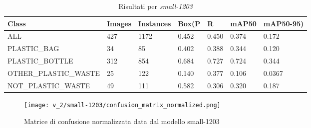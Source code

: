 \begin{table}[h]
    \centering
    \begin{tabularx}{\textwidth}{lYYYYYY}
        \toprule
        Class & Images & Instances & Box(P & R & mAP50 & mAP50-95) \\
        \midrule
        ALL & 427 & 1172 & 0.452 & 0.450 & 0.374 & 0.172 \\
        PLASTIC\_BAG & 34 & 85 & 0.402 & 0.388 & 0.344 & 0.120 \\
        PLASTIC\_BOTTLE & 312 & 854 & 0.684 & 0.727 & 0.724 & 0.344 \\
        OTHER\_PLASTIC\_WASTE & 25 & 122 & 0.140 & 0.377 & 0.106 & 0.0367 \\
        NOT\_PLASTIC\_WASTE & 49 & 111 & 0.582 & 0.306 & 0.320 & 0.187 \\
        \bottomrule
    \end{tabularx}
    \caption{Risultati per \textit{small-1203}}
\end{table}

\endgroup %
\restoregeometry %

\begin{figure}[h]
    \centering
    \texttt{[image: v\_2/small-1203/confusion\_matrix\_normalized.png]}
    \caption{Matrice di confusione normalizzata data dal modello small-1203}
    \label{fig:v2-4}
\end{figure}